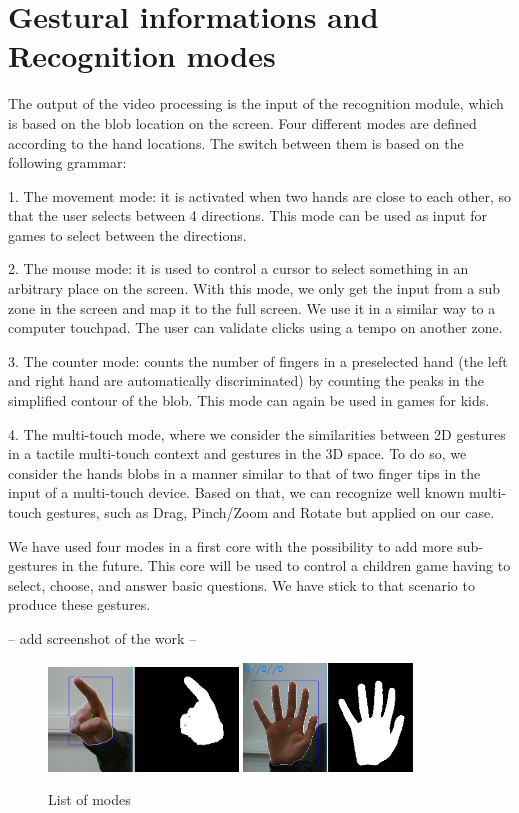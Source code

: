 \documentclass{llncs}
\begin{document}
\section{Gestural informations and Recognition modes}
The output of the video processing is the input of the recognition module, which is based on the blob location on the screen. Four different modes are defined according to the hand locations. The switch between them is based on the following grammar:

1. The movement mode:
it is activated when two hands are close to each other, so that the user selects between 4 directions. This mode can be used as input for games to select between the directions.

2. The mouse mode:
it is used to control a cursor to select something in an arbitrary place on the screen. With this mode, we only get the input from a sub zone in the screen and map it to the full screen. We use it in a similar way to a computer touchpad.
The user can validate clicks using a tempo on another zone.

3. The counter mode: counts the number of fingers in a preselected hand (the left and right hand are automatically discriminated) by counting the peaks in the simplified contour of the blob. This mode can again be used in games for kids.

4. The multi-touch mode, where we consider the similarities between 2D gestures in a tactile multi-touch context and gestures in the 3D space. To do so, we consider the hands blobs in a manner similar to that of two finger tips in the input of a multi-touch device. Based on that, we can recognize well known multi-touch gestures, such as Drag, Pinch/Zoom and Rotate but applied on our case.

We have used four modes in a first core with the possibility to add more sub-gestures in the future.
This core will be used to control a children game having to select, choose, and answer basic questions.
We have stick to that scenario to produce these gestures. 

-- add screenshot of the work --

\begin{figure}[!htb]
\centering
  \includegraphics[width=0.45\textwidth]{./pics/point.png}
  \includegraphics[width=0.4\textwidth]{./pics/simplify.png}
  \caption{List of modes}
\end{figure}
\end{document}
